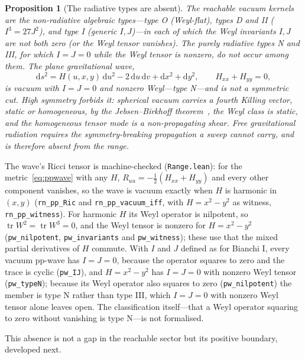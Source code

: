 \documentclass[11pt,a4paper]{article}
\newtheorem{proposition}[theorem]{Proposition}
\theoremstyle{definition}
\newcommand{\dd}{\mathrm{d}}
\begin{document}
\begin{proposition}[The radiative types are absent]\label{prop:radiative}
The reachable vacuum kernels are the non-radiative algebraic types---type O (Weyl-flat), types D and II ($I^{3}=27J^{2}$), and type I (generic $I,J$)---in each of which the Weyl invariants $I,J$ are not both zero (or the Weyl tensor vanishes). The purely radiative types N and III, for which $I=J=0$ while the Weyl tensor is nonzero, do not occur among them. The plane gravitational wave,
\begin{equation}\label{eq:ppwave}
\dd s^{2}=H(u,x,y)\,\dd u^{2}-2\,\dd u\,\dd v+\dd x^{2}+\dd y^{2},\qquad H_{xx}+H_{yy}=0,
\end{equation}
is vacuum with $I=J=0$ and nonzero Weyl---type N---and is not a symmetric cut. High symmetry forbids it: spherical vacuum carries a fourth Killing vector, static or homogeneous, by the Jebsen--Birkhoff theorem~\cite{Jebsen1921,Birkhoff1923}, the Weyl class is static, and the homogeneous tensor mode is a non-propagating shear. Free gravitational radiation requires the symmetry-breaking propagation a sweep cannot carry, and is therefore absent from the range.
\end{proposition}

\noindent The wave's Ricci tensor is machine-checked (\texttt{Range.lean}): for the metric~\eqref{eq:ppwave} with any $H$, $R_{uu}=-\tfrac12(H_{xx}+H_{yy})$ and every other component vanishes, so the wave is vacuum exactly when $H$ is harmonic in $(x,y)$ (\texttt{rn\_pp\_Ric} and \texttt{rn\_pp\_vacuum\_iff}, with $H=x^{2}-y^{2}$ as witness, \texttt{rn\_pp\_witness}). For harmonic $H$ its Weyl operator is nilpotent, so $\operatorname{tr}W^{2}=\operatorname{tr}W^{3}=0$, and the Weyl tensor is nonzero for $H=x^{2}-y^{2}$ (\texttt{pw\_nilpotent}, \texttt{pw\_invariants} and \texttt{pw\_witness}); these use that the mixed partial derivatives of $H$ commute. With $I$ and $J$ defined as for Bianchi I, every vacuum pp-wave has $I=J=0$, because the operator squares to zero and the trace is cyclic (\texttt{pw\_IJ}), and $H=x^{2}-y^{2}$ has $I=J=0$ with nonzero Weyl tensor (\texttt{pw\_typeN}); because its Weyl operator also squares to zero (\texttt{pw\_nilpotent}) the member is type N rather than type III, which $I=J=0$ with nonzero Weyl tensor alone leaves open. The classification itself---that a Weyl operator squaring to zero without vanishing is type N---is not formalised.

\noindent This absence is not a gap in the reachable sector but its positive boundary, developed next.
\end{document}
